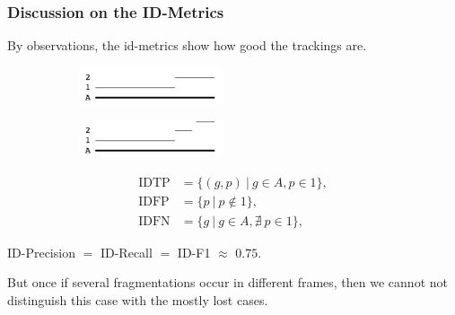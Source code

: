 \documentclass[slidetop, mathserif]{beamer}
\begin{document}
\begin{frame}
	\frametitle{Discussion on the ID-Metrics}
			
	By observations, the id-metrics show how good the trackings are.

	\quad
	
	\begin{figure}
		\begin{subfigure}{.5\textwidth}
			\centering
			\includegraphics[width=120pt]{pics/fig6.png}
		\end{subfigure}%
		\begin{subfigure}{.5\textwidth}
			\centering
			\includegraphics[width=120pt]{pics/fig7.png}
		\end{subfigure}
	\end{figure}
	\begin{minipage}{150pt}
	\begin{align*}
		\text{IDTP} & = \{(g,p)\ |\ g\in A, p\in 1\}, \\
		\text{IDFP} & = \{p\ |\ p\notin 1\}, \\
		\text{IDFN} & = \{g\ |\ g\in A, \nexists\ p\in 1\},
	\end{align*}
	\end{minipage}
	\begin{minipage}{130pt}
		ID-Precision $=$ ID-Recall $=$ ID-F1 $\approx$ $0.75$.
	\end{minipage}

	\vspace{5pt}

	But once if several fragmentations occur in different frames,
	then we cannot not distinguish this case with the mostly lost cases.

\end{frame}
\end{document}
